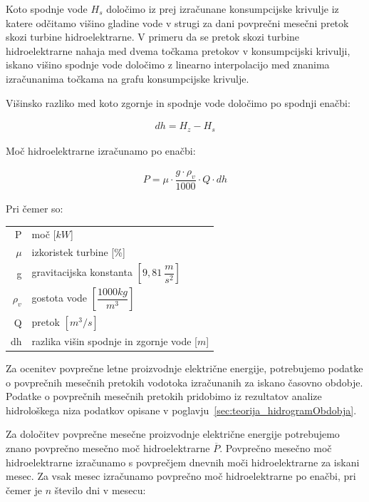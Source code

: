  Koto spodnje vode $H_s$ določimo iz prej izračunane konsumpcijske krivulje iz katere odčitamo višino gladine vode v strugi za dani povprečni mesečni pretok skozi turbine hidroelektrarne. V primeru da se pretok skozi turbine hidroelektrarne nahaja med dvema točkama pretokov v konsumpcijski krivulji, iskano višino spodnje vode določimo z linearno interpolacijo med znanima izračunanima točkama na grafu konsumpcijske krivulje.


Višinsko razliko med koto zgornje in spodnje vode določimo po spodnji enačbi:

\begin{ceqn}
\begin{align}
dh = H_z - H_s
\end{align}
\end{ceqn}

Moč hidroelektrarne izračunamo po enačbi:

\begin{ceqn}
\begin{align}
P = \mu \cdot \dfrac{g \cdot \rho_v}{1000} \cdot Q \cdot dh \label{eq:mocHidroelektrarne}
\end{align}
\end{ceqn}

Pri čemer so:
\begin{table}[htb!]
	\begin{tabular}{r|p{10cm}}
		P & moč [$kW$]\\
		$\mu$ & izkoristek turbine [\%]\\
		g & gravitacijska konstanta $\left[9,81~\dfrac{m}{s^{2}}\right]$ \\
		$\rho_v$&gostota vode $\left[\dfrac{1000 kg}{m^3}\right]$\\
		Q & pretok $\left[m^{3}/s \right]$\\
		dh & razlika višin spodnje in zgornje vode [$m$]
	\end{tabular}
\end{table}



Za ocenitev povprečne letne proizvodnje električne energije, potrebujemo podatke o povprečnih mesečnih pretokih vodotoka izračunanih za iskano časovno obdobje. Podatke o povprečnih mesečnih pretokih pridobimo iz rezultatov analize hidrološkega niza podatkov opisane v poglavju~\ref{sec:teorija_hidrogramObdobja}.



Za določitev povprečne mesečne proizvodnje električne energije potrebujemo znano povprečno mesečno moč hidroelektrarne  $\overline{P}$. Povprečno mesečno moč hidroelektrarne izračunamo s povprečjem dnevnih moči hidroelektrarne za iskani mesec. Za vsak mesec izračunamo povprečno moč hidroelektrarne po enačbi, pri čemer je $n$ število dni v mesecu:


